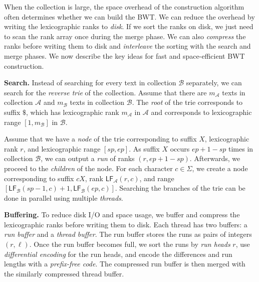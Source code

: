 \documentclass[smallabstract,smallcaptions]{dccpaper}
\newcommand{\BWT}{\textsf{BWT}}
\newcommand{\mLF}{\ensuremath{\mathsf{LF}}}
\newcommand{\Acoll}{\ensuremath{\mathcal{A}}}
\newcommand{\Bcoll}{\ensuremath{\mathcal{B}}}
\begin{document}
When the collection is large, the space overhead of the construction algorithm often determines whether we can build the \BWT{}.
%
We can reduce the overhead by writing the lexicographic ranks to \emph{disk}. If we sort the ranks on disk, we just need to scan the rank array once during the merge phase. We can also \emph{compress} the ranks before writing them to disk and \emph{interleave} the sorting with the search and merge phases. We now describe the key ideas for fast and space-efficient \BWT{} construction.

\smallbreak\noindent\textbf{Search.} Instead of searching for every text in collection $\Bcoll$ separately, we can search for the \emph{reverse trie} of the collection. Assume that there are $m_{\Acoll}$ texts in collection $\Acoll$ and $m_{\Bcoll}$ texts in collection $\Bcoll$. The \emph{root} of the trie corresponds to suffix $\$$, which has lexicographic rank $m_{\Acoll}$ in $\Acoll$ and corresponds to lexicographic range $[1,m_{\Bcoll}]$ in $\Bcoll$.

Assume that we have a \emph{node} of the trie corresponding to suffix $X$, lexicographic rank $r$, and lexicographic range $[sp,ep]$. As suffix $X$ occurs $ep+1-sp$ times in collection $\Bcoll$, we can output a \emph{run} of ranks $(r, ep+1-sp)$. Afterwards, we proceed to the \emph{children} of the node. For each character $c \in \Sigma$, we create a node corresponding to suffix $cX$, rank $\mLF_{\Acoll}(r,c)$, and range $[\mLF_{\Bcoll}(sp-1, c) + 1, \mLF_{\Bcoll}(ep, c)]$. Searching the branches of the trie can be done in parallel using multiple \emph{threads}.

\smallbreak\noindent\textbf{Buffering.} To reduce disk I/O and space usage, we buffer and compress the lexicographic ranks before writing them to disk. Each thread has two buffers: a \emph{run buffer} and a \emph{thread buffer}. The run buffer stores the runs as pairs of integers $(r, \ell)$. Once the run buffer becomes full, we sort the runs by \emph{run heads} $r$, use \emph{differential encoding} for the run heads, and encode the differences and run lengths with a \emph{prefix-free code}. The compressed run buffer is then merged with the similarly compressed thread buffer.
\end{document}
